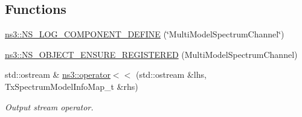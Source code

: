 \subsection*{Functions}
\begin{DoxyCompactItemize}
\item 
\hyperlink{namespacens3_a4f300b5da06c9f2b40990dd54710d086}{ns3\+::\+N\+S\+\_\+\+L\+O\+G\+\_\+\+C\+O\+M\+P\+O\+N\+E\+N\+T\+\_\+\+D\+E\+F\+I\+NE} (\char`\"{}Multi\+Model\+Spectrum\+Channel\char`\"{})
\item 
\hyperlink{namespacens3_afbf4621ed13e26bc4da897d7413961a2}{ns3\+::\+N\+S\+\_\+\+O\+B\+J\+E\+C\+T\+\_\+\+E\+N\+S\+U\+R\+E\+\_\+\+R\+E\+G\+I\+S\+T\+E\+R\+ED} (Multi\+Model\+Spectrum\+Channel)
\item 
std\+::ostream \& \hyperlink{namespacens3_adf4d403375c25a02ac6de8d1a65a90bd}{ns3\+::operator$<$$<$} (std\+::ostream \&lhs, Tx\+Spectrum\+Model\+Info\+Map\+\_\+t \&rhs)
\begin{DoxyCompactList}\small\item\em Output stream operator. \end{DoxyCompactList}\end{DoxyCompactItemize}
